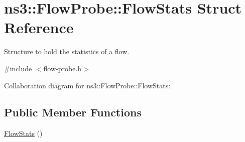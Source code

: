 \hypertarget{structns3_1_1FlowProbe_1_1FlowStats}{}\section{ns3\+:\+:Flow\+Probe\+:\+:Flow\+Stats Struct Reference}
\label{structns3_1_1FlowProbe_1_1FlowStats}


Structure to hold the statistics of a flow.  




{\ttfamily \#include $<$flow-\/probe.\+h$>$}



Collaboration diagram for ns3\+:\+:Flow\+Probe\+:\+:Flow\+Stats\+:
\subsection*{Public Member Functions}
\begin{DoxyCompactItemize}
\item 
\hyperlink{structns3_1_1FlowProbe_1_1FlowStats_a970d433f9d5cff8c868a845c56985b4e}{Flow\+Stats} ()
\end{DoxyCompactItemize}
